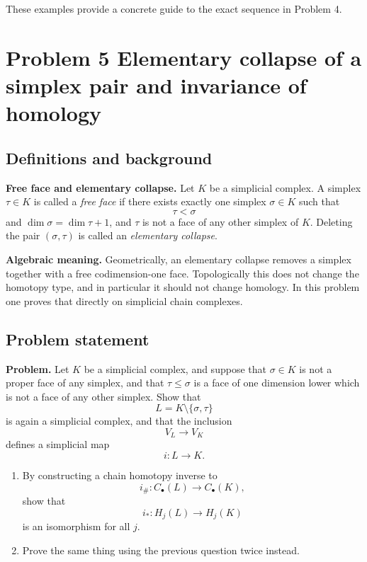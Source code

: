 \documentclass[12pt,a4paper]{article}
\theoremstyle{notespace}
\begin{document}
These examples provide a concrete guide to the exact sequence in Problem 4.

\section{Problem 5 Elementary collapse of a simplex pair and invariance of homology}

\subsection{Definitions and background}

\textbf{Free face and elementary collapse.}
Let \(K\) be a simplicial complex. A simplex \(\tau\in K\) is called a \emph{free face} if there exists exactly one simplex \(\sigma\in K\) such that
\[
\tau < \sigma
\]
and \(\dim \sigma = \dim \tau +1\), and \(\tau\) is not a face of any other simplex of \(K\). Deleting the pair \((\sigma,\tau)\) is called an \emph{elementary collapse}.

\medskip

\textbf{Algebraic meaning.}
Geometrically, an elementary collapse removes a simplex together with a free codimension-one face. Topologically this does not change the homotopy type, and in particular it should not change homology. In this problem one proves that directly on simplicial chain complexes.

\subsection{Problem statement}

\textbf{Problem.}
Let \(K\) be a simplicial complex, and suppose that \(\sigma\in K\) is not a proper face of any simplex, and that \(\tau\le \sigma\) is a face of one dimension lower which is not a face of any other simplex. Show that
\[
L=K\setminus \{\sigma,\tau\}
\]
is again a simplicial complex, and that the inclusion
\[
V_L\to V_K
\]
defines a simplicial map
\[
i:L\to K.
\]

\begin{enumerate}
	\item[(i)] By constructing a chain homotopy inverse to
	\[
	i_\#:C_\bullet(L)\to C_\bullet(K),
	\]
	show that
	\[
	i_*:H_j(L)\to H_j(K)
	\]
	is an isomorphism for all \(j\).
	
	\item[(ii)] Prove the same thing using the previous question twice instead.
\end{enumerate}
\end{document}
